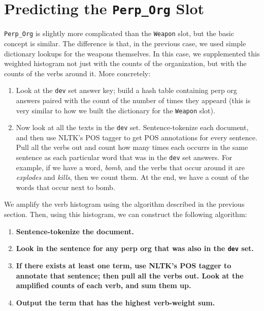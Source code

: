 \documentclass[11pt]{myclass}
\begin{document}
\section{Predicting the \texttt{Perp\_Org} Slot}

\texttt{Perp\_Org} is slightly more complicated than the \texttt{Weapon} slot, but the basic concept is similar. The difference is that, in the previous case, we used simple dictionary lookups for the weapons themselves. In this case, we supplemented this weighted histogram not just with the counts of the organization, but with the counts of the verbs around it. More concretely:

\begin{enumerate}
\item Look at the \texttt{dev} set answer key; build a hash table containing perp org answers paired with the count of the number of times they appeard (this is very similar to how we built the dictionary for the \texttt{Weapon} slot).

\item Now look at all the texts in the \texttt{dev} set. Sentence-tokenize each document, and then use NLTK's POS tagger to get POS annotations for every sentence. Pull all the verbs out and count how many times each occurrs in the same sentence as each particular word that was in the \texttt{dev} set answers. For example, if we have a word, \textit{bomb}, and the verbs that occur around it are \textit{explodes} and \textit{kills}, then we count them. At the end, we have a count of the words that occur next to bomb.
\end{enumerate}

We amplify the verb histogram using the algorithm described in the previous section. Then, using this histogram, we can construct the following algorithm:

\begin{enumerate}
\item \textbf{Sentence-tokenize the document.}

\item \textbf{Look in the sentence for any perp org that was also in the \texttt{dev} set.}

\item \textbf{If there exists at least one term, use NLTK's POS tagger to annotate that sentence; then pull all the verbs out. Look at the amplified counts of each verb, and sum them up.}

\item \textbf{Output the term that has the highest verb-weight sum.}
\end{enumerate}
\end{document}
